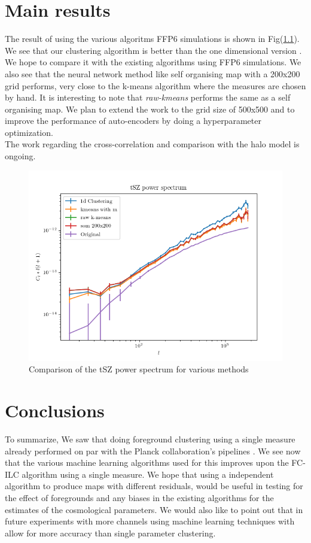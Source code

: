 \chapter{Main results}

      The result of using the various algoritms FFP6 simulations is shown in Fig(\ref{results}).
We see that our clustering algorithm is better than the one dimensional version \cite{datarishi}.
We hope to compare it with the existing algorithms using FFP6 simulations. We also see that the
neural network method like self organising map with a 200x200 grid performs, very close to the
k-means algorithm where the measures are chosen by hand. It is interesting to note that
\emph{raw-kmeans} performs the same as a self organising map. We plan to extend the work
to the grid size of 500x500 and to improve the performance of auto-encoders
by doing a hyperparameter optimization.
\\
The work regarding the cross-correlation and comparison with the halo model is ongoing.
\begin{figure}[H]
  \centering
  \label{results}
  \includegraphics[width=0.7\linewidth]{cl_plots.png}
  \caption{Comparison of the tSZ power spectrum for various methods}
\end{figure}

\chapter{ Conclusions}
      To summarize, We saw that doing foreground clustering using a single measure already
performed on par with the Planck collaboration's pipelines \cite{datarishi}.
We see now that the various machine learning algorithms used for this improves upon the FC-ILC
algorithm using a single measure. We hope that using a independent algorithm to produce maps with
different residuals, would be useful in testing for the effect of foregrounds and any biases in
the existing algorithms for the estimates of the cosmological parameters. We would also like to
point out that in future experiments with more channels using machine learning techniques
with allow for more accuracy than single parameter clustering. 

